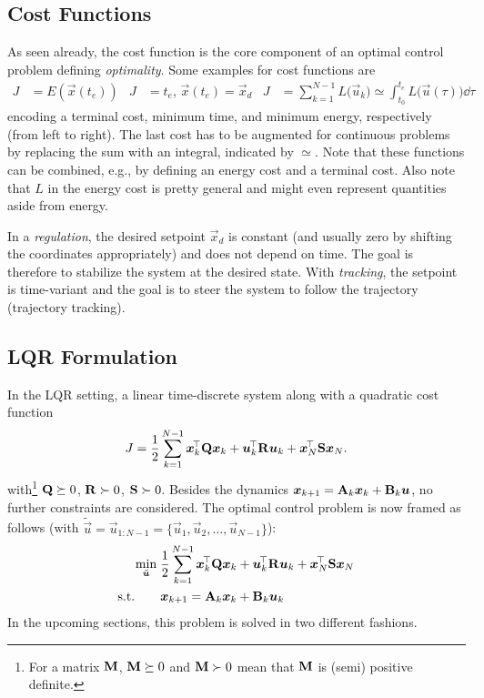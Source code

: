 		\subsection{Cost Functions}
			As seen already, the cost function is the core component of an optimal control problem defining \emph{optimality}. Some examples for cost functions are
			\begin{align}
				J &= E(\vec{x}(t_e)) &
				J &= t_e,\, \vec{x}(t_e) = \vec{x}_d &
				J &= \sum_{k = 1}^{N - 1} L\bigl( \vec{u}_k \bigr) \simeq \int_{t_0}^{t_e}\! L\bigl( \vec{u}(\tau) \bigr) \dd{\tau}
			\end{align}
			encoding a terminal cost, minimum time, and minimum energy, respectively (from left to right). The last cost has to be augmented for continuous problems by replacing the sum with an integral, indicated by \( \simeq \). Note that these functions can be combined, e.g., by defining an energy cost and a terminal cost. Also note that \(L\) in the energy cost is pretty general and might even represent quantities aside from energy.

			In a \emph{regulation}, the desired setpoint \(\vec{x}_d\) is constant (and usually zero by shifting the coordinates appropriately) and does not depend on time. The goal is therefore to stabilize the system at the desired state. With \emph{tracking}, the setpoint is time-variant and the goal is to steer the system to follow the trajectory (trajectory tracking).

		\subsection{LQR Formulation}
			In the LQR setting, a linear time-discrete system along with a quadratic cost function
			\begin{equation}
				J = \frac{1}{2} \sum_{k = 1}^{N - 1} \bm{x}_k^{\!\top} \bm{\mathrm{Q}} \bm{x}_k + \bm{u}_k^{\!\top} \bm{\mathrm{R}} \bm{u}_k + \bm{x}_N^{\!\top} \bm{\mathrm{S}} \bm{x}_N.  \label{eqn:lqrCost}
			\end{equation}
			with\footnote{For a matrix \(\bm{\mathrm{M}}\), \( \bm{\mathrm{M}} \succeq 0\) and \( \bm{\mathrm{M}} \succ 0 \) mean that \(\bm{\mathrm{M}}\) is (semi) positive definite.} \( \bm{\mathrm{Q}} \succeq 0 \), \( \bm{\mathrm{R}} \succ 0 \), \( \bm{\mathrm{S}} \succ 0 \). Besides the dynamics \( \bm{x}_{k + 1} = \bm{\mathrm{A}}_k \bm{x}_k + \bm{\mathrm{B}}_k \bm{u} \), no further constraints are considered. The optimal control problem is now framed as follows (with \( \tilde{\vec{u}} = \vec{u}_{1:N - 1} = \{ \vec{u}_1, \vec{u}_2, \dots, \vec{u}_{N - 1} \} \)):
			\begin{align}
				\min_{\tilde{\bm{u}}}\; & \frac{1}{2} \sum_{k = 1}^{N - 1} \bm{x}_k^{\!\top} \bm{\mathrm{Q}} \bm{x}_k + \bm{u}_k^{\!\top} \bm{\mathrm{R}} \bm{u}_k + \bm{x}_N^{\!\top} \bm{\mathrm{S}} \bm{x}_N \\
				\text{s.t.}\qquad&
					\begin{aligned}
						\bm{x}_{k + 1} &= \bm{\mathrm{A}}_k \bm{x}_k + \bm{\mathrm{B}}_k \bm{u}_k
					\end{aligned}
				\label{eqn:lqr}
			\end{align}
			In the upcoming sections, this problem is solved in two different fashions.

